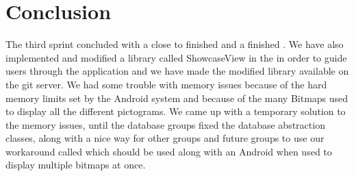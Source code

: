
\chapter{Conclusion}
\label{cha:conclusion_sprint_3}

The third sprint concluded with a close to finished \ct and a finished . We have also implemented and modified a library called ShowcaseView in the \ct in order to guide users through the application and we have made the modified library available on the \giraf git server. We had some trouble with memory issues because of the hard memory limits set by the Android system and because of the many Bitmaps used to display all the different pictograms. We came up with a temporary solution to the memory issues, until the database groups fixed the database abstraction classes, along with a nice way for other groups and future groups to use our workaround called  which should be used along with an Android  when used to display multiple bitmaps at once.

